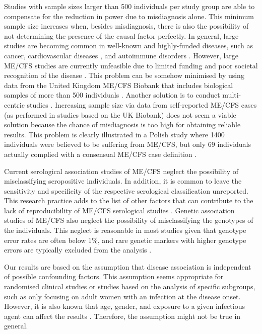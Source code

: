 Studies with sample sizes larger than 500 individuals per study group are able to compensate for the reduction in power due to misdiagnosis alone. This minimum sample size increases when, besides misdiagnosis, there is also the possibility of not determining the presence of the causal factor perfectly. In general, large studies are becoming common in well-known and highly-funded diseases, such as cancer, cardiovascular diseases \citep{giri2019TransethnicAssociation}, and autoimmune disorders \citep{internationalmultiplesclerosisgeneticsconsortiumimsgc2013AnalysisImmunerelated, bjornevik2022LongitudinalAnalysis}. However, large ME/CFS studies are currently unfeasible due to limited funding and poor societal recognition of the disease \citep{pheby2021LiteratureReview}. This problem can be somehow minimised by using data from the United Kingdom ME/CFS Biobank that includes biological samples of more than 500 individuals \citep{lacerda2018UKME}. Another solution is to conduct multi-centric studies \citep{scheibenbogen2017EuropeanME}. Increasing sample size via data from self-reported ME/CFS cases (as performed in studies based on the UK Biobank) does not seem a viable solution because the chance of misdiagnosis is too high for obtaining reliable results. This problem is clearly illustrated in a Polish study where 1400 individuals were believed to be suffering from ME/CFS, but only 69 individuals actually complied with a consensual ME/CFS case definition \citep{slomko2019PrevalenceCharacteristics}.

Current serological association studies of ME/CFS neglect the possibility of misclassifying seropositive individuals. In addition, it is common to leave the sensitivity and specificity of the respective serological classification unreported. This research practice adds to the list of other factors that can contribute to the lack of reproducibility of ME/CFS serological studies \citep{ariza2020CommentaryAntibodies}. Genetic association studies of ME/CFS also neglect the possibility of misclassifying the genotypes of the individuals. This neglect is reasonable in most studies given that genotype error rates are often below 1\%, and rare genetic markers with higher genotype errors are typically excluded from the analysis \citep{grabowska2020ReviewQuality, hajdarevic2021FineMapping, hajdarevic2022GeneticAssociation}.

Our results are based on the assumption that disease association is independent of possible confounding factors. This assumption seems appropriate for randomised clinical studies or studies based on the analysis of specific subgroups, such as only focusing on adult women with an infection at the disease onset. However, it is also known that age, gender, and exposure to a given infectious agent can affect the results \citep{domingues2021HerpesvirusesSerologya, szklarski2021DelineatingAssociationa}. Therefore, the assumption might not be true in general.

